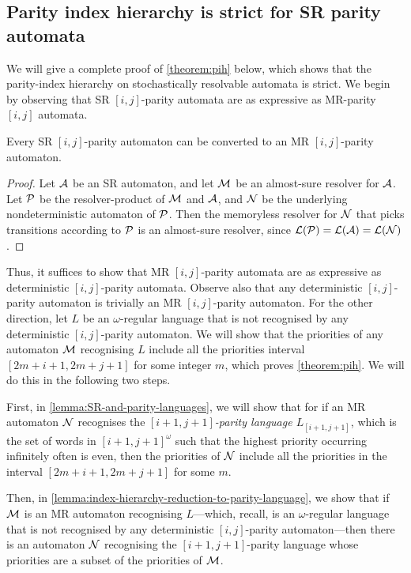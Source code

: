 \subsection{Parity index hierarchy is strict for SR parity automata}
We will give a complete proof of \cref{theorem:pih} below, which shows that the parity-index hierarchy on stochastically resolvable automata is strict.
\pih*
We begin by observing that SR $[i,j]$-parity automata are as expressive as MR-parity $[i,j]$  automata.

\begin{lemma}
    Every SR $[i,j]$-parity  automaton can be converted to an MR $[i,j]$-parity  automaton.
\end{lemma}
\begin{proof}
    Let $\mathcal{A}$ be an SR automaton, and let $\mathcal{M}$ be an almost-sure resolver for $\mathcal{A}$. Let $\mathcal{P}$ be the resolver-product of $\mathcal{M}$ and $\mathcal{A}$, and $\mathcal{N}$ be the underlying nondeterministic automaton of $\mathcal{P}$. Then  the memoryless resolver for $\mathcal{N}$ that picks transitions according to $\mathcal{P}$ is an almost-sure resolver, since $\mathcal{L}(\mathcal{P}) = \mathcal{L}(\mathcal{A}) = \mathcal{L}(\mathcal{N})$.
\end{proof}

Thus, it suffices to show that MR $[i,j]$-parity automata are as expressive as deterministic $[i,j]$-parity  automata. 
Observe also that any deterministic $[i,j]$-parity  automaton is trivially an MR $[i,j]$-parity automaton. For the other direction, let $L$ be an $\omega$-regular language that is not recognised by any deterministic $[i,j]$-parity automaton. We will show that the priorities of any automaton $\mathcal{M}$ recognising $L$ include all the priorities interval $[2m+i+1,2m+j+1]$ for some integer $m$, which proves \cref{theorem:pih}. We will do this in the following two steps. 

First, in \cref{lemma:SR-and-parity-languages}, we will show that for if an MR automaton $\mathcal{N}$ recognises the \emph{$[i+1,j+1]$-parity language $L_{[i+1,j+1]}$}, which is the set of words in $[i+1,j+1]^{\omega}$ such that the highest priority occurring infinitely often is even, then the priorities of $\mathcal{N}$ include all the priorities in the interval $[2m+i+1,2m+j+1]$ for some $m$. 

Then, in \cref{lemma:index-hierarchy-reduction-to-parity-language}, we show that if $\mathcal{M}$ is an MR automaton recognising $L$---which, recall, is an $\omega$-regular language that is not recognised by any deterministic $[i,j]$-parity automaton---then there is an automaton $\mathcal{N}$ recognising the $[i+1,j+1]$-parity language whose priorities are a subset of the priorities of $\mathcal{M}$. 

